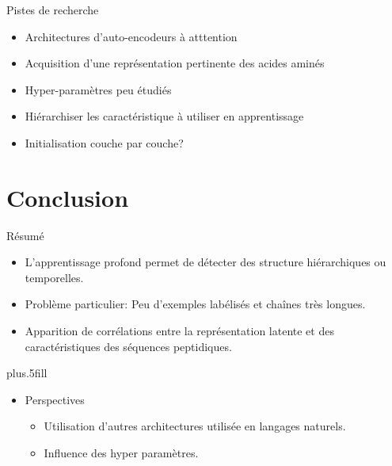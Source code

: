 \documentclass{beamer}
\begin{document}
\begin{frame}{Pistes de recherche}


    \begin{itemize}
    \item Architectures d'auto-encodeurs à atttention\pause
    \item Acquisition d'une représentation pertinente des acides aminés\pause
    \item Hyper-paramètres peu étudiés\pause
    \item Hiérarchiser les caractéristique à utiliser en apprentissage\pause
    \item Initialisation couche par couche?
    \end{itemize}
 \end{frame}


\section*{Conclusion}

\begin{frame}{Résumé}

  \begin{itemize}
  \item
    L'apprentissage profond permet de \alert{détecter des structure
      hiérarchiques ou temporelles}.\pause
  \item
    Problème particulier: Peu \alert{d'exemples labélisés} et \alert{chaînes très longues}.\pause
  \item
    Apparition de \alert{corrélations} entre la représentation latente et des
    caractéristiques des séquences peptidiques.\pause
  \end{itemize}
  
  \vskip0pt plus.5fill
  \begin{itemize}
  \item
    Perspectives\pause
    \begin{itemize}
    \item
      Utilisation d'autres architectures utilisée en langages naturels.\pause
    \item
      Influence des hyper paramètres.
    \end{itemize}
  \end{itemize}
\end{frame}
\end{document}
